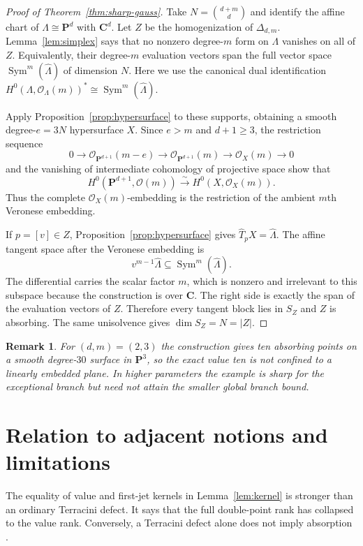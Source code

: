 \documentclass[11pt]{article}
\newtheorem{remark}[theorem]{Remark}
\newcommand{\PP}{\mathbf P}
\newcommand{\CC}{\mathbf C}
\newcommand{\cO}{\mathcal O}
\newcommand{\Sym}{\operatorname{Sym}}
\begin{document}
\begin{proof}[Proof of Theorem~\ref{thm:sharp-gauss}]
Take $N=\binom{d+m}{d}$ and identify the affine chart of
$\Lambda\cong\PP^d$ with $\CC^d$.  Let $Z$ be the homogenization of
$\Delta_{d,m}$.  Lemma~\ref{lem:simplex} says that no nonzero degree-$m$
form on $\Lambda$ vanishes on all of $Z$.  Equivalently, their degree-$m$
evaluation vectors span the full vector space $\Sym^m(\widehat\Lambda)$ of
dimension $N$.  Here we use the canonical dual identification
$H^0(\Lambda,\cO_\Lambda(m))^*\cong\Sym^m(\widehat\Lambda)$.

Apply Proposition~\ref{prop:hypersurface} to these supports, obtaining a
smooth degree-$e=3N$ hypersurface $X$.  Since $e>m$ and $d+1\geq3$, the
restriction sequence
\[
 0\longrightarrow\cO_{\PP^{d+1}}(m-e)
 \longrightarrow\cO_{\PP^{d+1}}(m)
 \longrightarrow\cO_X(m)\longrightarrow0
\]
and the vanishing of intermediate cohomology of projective space
\cite[III, Theorem~5.1]{Hartshorne1977} show that
\[
 H^0(\PP^{d+1},\cO(m))\xrightarrow{\sim}H^0(X,\cO_X(m)).
\]
Thus the complete $\cO_X(m)$-embedding is the restriction of the ambient
$m$th Veronese embedding.

If $p=[v]\in Z$, Proposition~\ref{prop:hypersurface} gives
$\widehat T_pX=\widehat\Lambda$.  The affine tangent space after the Veronese
embedding is
\[
 v^{m-1}\widehat\Lambda\subseteq\Sym^m(\widehat\Lambda).
\]
The differential carries the scalar factor $m$, which is nonzero and
irrelevant to this subspace because the construction is over $\CC$.
The right side is exactly the span of the evaluation vectors of $Z$.
Therefore every tangent block lies in $S_Z$ and $Z$ is absorbing.  The same
unisolvence gives $\dim S_Z=N=|Z|$.
\end{proof}

\begin{remark}
For $(d,m)=(2,3)$ the construction gives ten absorbing points on a smooth
degree-$30$ surface in $\PP^3$, so the exact value ten is not confined to a
linearly embedded plane.  In higher parameters the example is sharp for the
exceptional branch but need not attain the smaller global branch bound.
\end{remark}

\section{Relation to adjacent notions and limitations}

The equality of value and first-jet kernels in
Lemma~\ref{lem:kernel} is stronger than an ordinary Terracini defect.  It says
that the full double-point rank has collapsed to the value rank.  Conversely,
a Terracini defect alone does not imply absorption
\cite{BallicoChiantini2021,GaluppiEtAl2023}.
\end{document}
